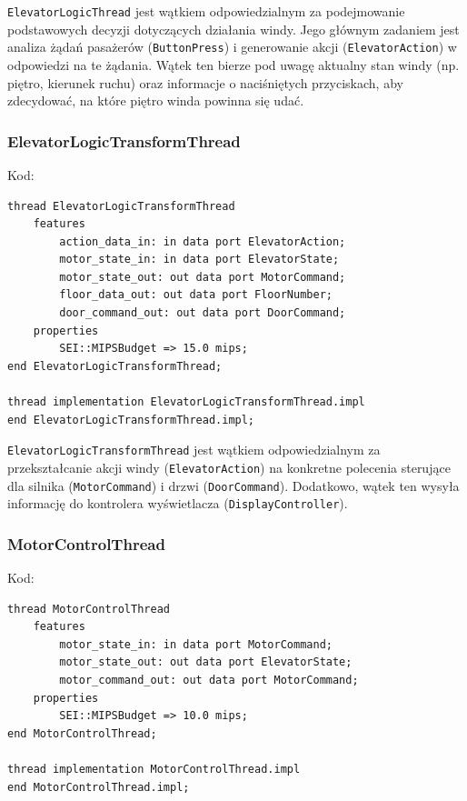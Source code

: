 \documentclass{article}
\begin{document}
    \texttt{ElevatorLogicThread} jest wątkiem odpowiedzialnym za podejmowanie podstawowych decyzji dotyczących działania windy. Jego głównym zadaniem jest analiza żądań pasażerów (\texttt{ButtonPress}) i generowanie akcji (\texttt{ElevatorAction}) w odpowiedzi na te żądania. Wątek ten bierze pod uwagę aktualny stan windy (np. piętro, kierunek ruchu) oraz informacje o naciśniętych przyciskach, aby zdecydować, na które piętro winda powinna się udać.



    \subsubsection{ElevatorLogicTransformThread}

    Kod:
    
    \begin{lstlisting}[basicstyle=\ttfamily, keywordstyle=\bfseries]
thread ElevatorLogicTransformThread
    features
        action_data_in: in data port ElevatorAction;
        motor_state_in: in data port ElevatorState;
        motor_state_out: out data port MotorCommand;
        floor_data_out: out data port FloorNumber;
        door_command_out: out data port DoorCommand;
    properties
        SEI::MIPSBudget => 15.0 mips;
end ElevatorLogicTransformThread;

thread implementation ElevatorLogicTransformThread.impl
end ElevatorLogicTransformThread.impl;
    \end{lstlisting}

    \texttt{ElevatorLogicTransformThread} jest wątkiem odpowiedzialnym za przekształcanie akcji windy (\texttt{ElevatorAction}) na konkretne polecenia sterujące dla silnika (\texttt{MotorCommand}) i drzwi (\texttt{DoorCommand}). Dodatkowo, wątek ten wysyła informację do kontrolera wyświetlacza (\texttt{DisplayController}).



    \subsubsection{MotorControlThread}

    Kod:
    
    \begin{lstlisting}[basicstyle=\ttfamily, keywordstyle=\bfseries]
thread MotorControlThread
    features
        motor_state_in: in data port MotorCommand;
        motor_state_out: out data port ElevatorState;
        motor_command_out: out data port MotorCommand;
    properties
        SEI::MIPSBudget => 10.0 mips;
end MotorControlThread;

thread implementation MotorControlThread.impl
end MotorControlThread.impl;
    \end{lstlisting}
\end{document}
